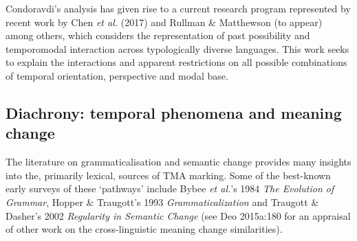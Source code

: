 \documentclass[12pt]{article}
\begin{document}
Condoravdi's analysis has given rise to a current research program represented by recent work by Chen \textit{et al.} (2017) and Rullman \& Matthewson (to appear) among others, which considers the representation of past possibility and temporomodal interaction across typologically diverse languages. This work seeks to explain the interactions and apparent restrictions on all possible combinations of temporal orientation, perspective and modal base.

	\subsection{Diachrony: temporal phenomena and meaning change}\label{dia}

The literature on grammaticalisation and semantic change provides many insights into the, primarily lexical, sources of TMA marking. Some of the best-known early surveys of these `pathways' include Bybee \textit{et al.}'s 1984 \textit{The Evolution of Grammar}, Hopper \& Traugott's 1993 \textit{Grammaticalization} and Traugott \& Dasher's 2002 \textit{Regularity in Semantic Change} (see Deo 2015a:180 for an appraisal of other work on the cross-linguistic meaning change similarities).
\end{document}
